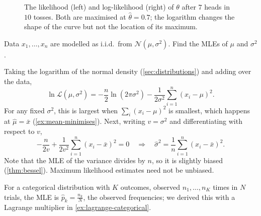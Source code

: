 \begin{figure}[htbp]
\centering
{}
\caption{The likelihood (left) and log-likelihood (right) of $\theta$ after
  $7$ heads in $10$ tosses. Both are maximised at $\hat\theta = 0.7$; the
  logarithm changes the shape of the curve but not the location of its maximum.}
\label{fig:likelihood}
\end{figure}

\begin{example}\label{ex:mle-gaussian}
Data $x_1, \dots, x_n$ are modelled as i.i.d.\ from $\mathcal{N}(\mu, \sigma^2)$.
Find the MLEs of $\mu$ and $\sigma^2$.

\sol Taking the logarithm of the normal density (\cref{sec:distributions}) and
adding over the data,
\[
  \ln\mathcal{L}(\mu, \sigma^2) = -\frac n2\ln(2\pi\sigma^2)
  - \frac{1}{2\sigma^2}\sum_{i=1}^n(x_i - \mu)^2 .
\]
For any fixed $\sigma^2$, this is largest when $\sum_i(x_i - \mu)^2$ is smallest,
which happens at $\hat\mu = \bar x$ (\cref{ex:mean-minimises}). Next, writing
$v = \sigma^2$ and differentiating with respect to $v$,
\[
  -\frac{n}{2v} + \frac{1}{2v^2}\sum_{i=1}^n(x_i - \bar x)^2 = 0
  \quad\Longrightarrow\quad
  \hat\sigma^2 = \frac1n\sum_{i=1}^n(x_i - \bar x)^2 .
\]
Note that the MLE of the variance divides by $n$, so it is slightly biased
(\cref{thm:bessel}). Maximum likelihood estimates need not be unbiased.
\end{example}

For a categorical distribution with $K$ outcomes, observed $n_1, \dots, n_K$
times in $N$ trials, the MLE is $\hat p_k = \frac{n_k}{N}$, the observed
frequencies; we derived this with a Lagrange multiplier in
\cref{ex:lagrange-categorical}.

